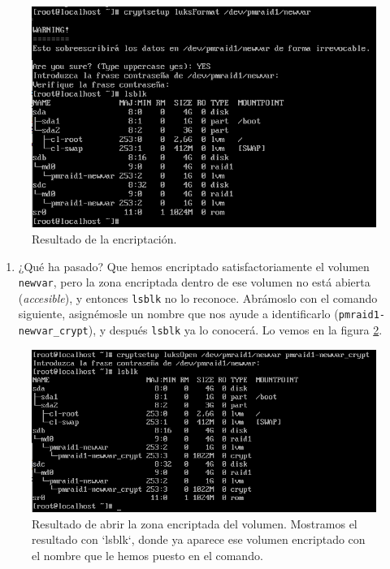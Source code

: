 \documentclass[
]{memoir}
\providecommand{\tightlist}{%
  \setlength{\itemsep}{0pt}\setlength{\parskip}{0pt}}
\begin{document}
\begin{figure}

{\centering \includegraphics[width=0.75\linewidth]{images/8} 

}

\caption{Resultado de la encriptación.}\label{fig:8h}
\end{figure}

\begin{enumerate}
\def\labelenumi{\arabic{enumi}.}
\setcounter{enumi}{9}
\tightlist
\item
  ¿Qué ha pasado? Que hemos encriptado satisfactoriamente el volumen \texttt{newvar}, pero la zona encriptada dentro de ese volumen no está abierta (\emph{accesible}), y entonces \texttt{lsblk} no lo reconoce. Abrámoslo con el comando siguiente, asignémosle un nombre que nos ayude a identificarlo (\texttt{pmraid1-newvar\_crypt}), y después \texttt{lsblk} ya lo conocerá. Lo vemos en la figura \ref{fig:9h}.
\end{enumerate}

\begin{figure}

{\centering \includegraphics[width=0.95\linewidth]{images/9} 

}

\caption{Resultado de abrir la zona encriptada del volumen. Mostramos el resultado con `lsblk`, donde ya aparece ese volumen encriptado con el nombre que le hemos puesto en el comando.}\label{fig:9h}
\end{figure}
\end{document}
